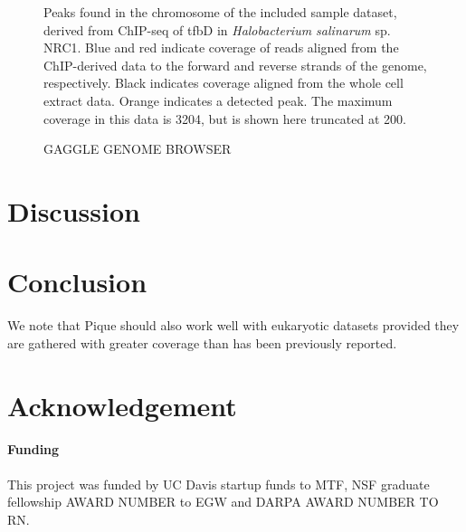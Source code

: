 \documentclass{bioinfo}
\begin{document}
\begin{figure}[!tfbd peak - a nice one]%
  \begin{center}
    {}
  \end{center}
  \caption{Peaks found in the chromosome of the included sample
    dataset, derived from ChIP-seq of tfbD in {\em Halobacterium
      salinarum} sp. NRC1. Blue and red indicate coverage of reads
    aligned from the ChIP-derived data to the forward and reverse
    strands of the genome, respectively. Black indicates coverage
    aligned from the whole cell extract data. Orange indicates a
    detected peak. The maximum coverage in this data is 3204, but is
    shown here truncated at 200.}\label{fig:01}
\end{figure}

\begin{figure}[!tfbd data - reasonable spot showing curation]%
\caption{GAGGLE GENOME BROWSER}\label{fig:02}
\end{figure}
\section{Discussion}


\section{Conclusion}

We note that Pique should also work well with eukaryotic datasets
provided they are gathered with greater coverage than has been
previously reported.

\section*{Acknowledgement}
\paragraph{Funding\textcolon} 

This project was funded by UC Davis startup funds to MTF, NSF graduate
fellowship AWARD NUMBER to EGW and DARPA AWARD NUMBER TO RN.

%
%
%
%
%




\end{document}
